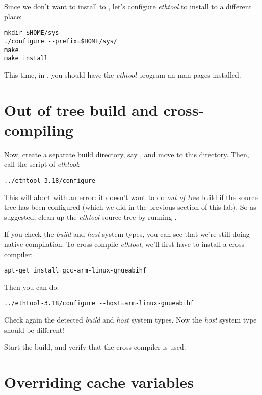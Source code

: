 Since we don't want to install to , let's configure
{\em ethtool} to install to a different place:

\begin{verbatim}
mkdir $HOME/sys
./configure --prefix=$HOME/sys/
make
make install
\end{verbatim}

This time, in , you should have the {\em ethtool}
program an man pages installed.

\section{Out of tree build and cross-compiling}

Now, create a separate build directory, say ,
and move to this directory. Then, call the  script of
{\em ethtool}:

\begin{verbatim}
../ethtool-3.18/configure
\end{verbatim}

This will abort with an error: it doesn't want to do {\em out of tree}
build if the source tree has been configured (which we did in the
previous section of this lab). So as suggested, clean up the {\em
  ethtool} source tree by running .

If you check the {\em build} and {\em host} system types, you can see
that we're still doing native compilation. To cross-compile {\em
  ethtool}, we'll first have to install a cross-compiler:

\begin{verbatim}
apt-get install gcc-arm-linux-gnueabihf
\end{verbatim}

Then you can do:

\begin{verbatim}
../ethtool-3.18/configure --host=arm-linux-gnueabihf
\end{verbatim}

Check again the detected {\em build} and {\em host} system types. Now
the {\em host} system type should be different!

Start the build, and verify that the cross-compiler is used.

\section{Overriding cache variables}

